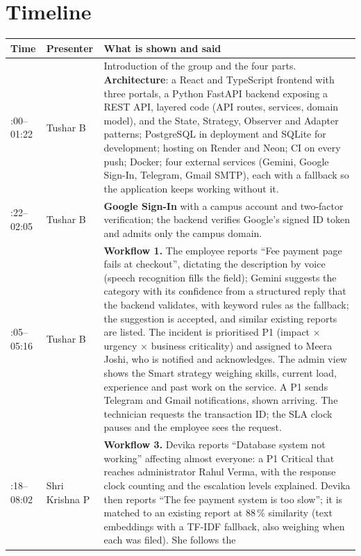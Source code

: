 \section{Timeline}
\begin{longtable}{@{}>{\raggedright\arraybackslash}p{2.2cm}>{\raggedright\arraybackslash}p{2.6cm}>{\raggedright\arraybackslash}p{10.8cm}@{}}
\toprule
\textbf{Time} & \textbf{Presenter} & \textbf{What is shown and said} \\
\midrule
\endhead
00:00--01:22 & Tushar B & Introduction of the group and the four parts. \textbf{Architecture}:
  a React and TypeScript frontend with three portals, a Python FastAPI backend exposing a REST
  API, layered code (API routes, services, domain model), and the State, Strategy, Observer and
  Adapter patterns; PostgreSQL in deployment and SQLite for development; hosting on Render and
  Neon; CI on every push; Docker; four external services (Gemini, Google Sign-In, Telegram,
  Gmail SMTP), each with a fallback so the application keeps working without it. \\
01:22--02:05 & Tushar B & \textbf{Google Sign-In} with a campus account and two-factor
  verification; the backend verifies Google's signed ID token and admits only the campus
  domain. \\
02:05--05:16 & Tushar B & \textbf{Workflow 1.} The employee reports ``Fee payment page fails at
  checkout'', dictating the description by voice (speech recognition fills the field); Gemini
  suggests the category with its confidence from a structured reply that the backend
  validates, with keyword rules as the fallback; the suggestion is accepted, and similar
  existing reports are listed. The incident is prioritised P1 (impact $\times$ urgency $\times$
  business criticality) and assigned to Meera Joshi, who is notified and acknowledges. The
  admin view shows the Smart strategy weighing skills, current load, experience and past work
  on the service. A P1 sends Telegram and Gmail notifications, shown arriving. The technician
  requests the transaction ID; the SLA clock pauses and the employee sees the request. \\
05:18--08:02 & Shri Krishna P & \textbf{Workflow 3.} Devika reports ``Database system not
  working'' affecting almost everyone: a P1 Critical that reaches administrator Rahul Verma, with
  the response clock counting and the escalation levels explained. Devika then reports ``The fee
  payment system is too slow''; it is matched to an existing report at 88\,\% similarity (text
  embeddings with a TF-IDF fallback, also weighing when each was filed). She follows the

\end{longtable}
